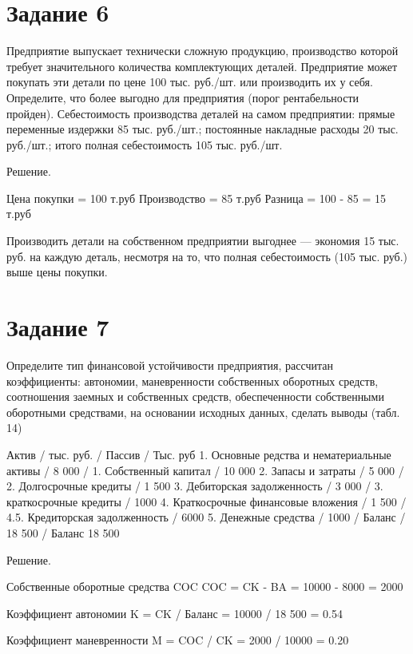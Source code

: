 \documentclass[14pt,a4paper]{extarticle}
\begin{document}
\section{Задание 6}
\begin{sloppypar}
    Предприятие выпускает технически сложную продукцию, производство которой
    требует значительного количества комплектующих деталей. Предприятие может
    покупать эти детали по цене 100 тыс. руб./шт. или производить их у себя.
    Определите, что более выгодно для предприятия (порог рентабельности
    пройден). Себестоимость производства деталей на самом предприятии: прямые
    переменные издержки 85 тыс. руб./шт.; постоянные накладные расходы 20 тыс.
    руб./шт.; итого полная себестоимость 105 тыс. руб./шт.
\end{sloppypar}

Решение.

Цена покупки = 100 т.руб
Производство = 85 т.руб
Разница = 100 - 85 = 15 т.руб

Производить детали на собственном предприятии выгоднее — экономия 15 тыс. руб. на каждую деталь, несмотря на то, что полная себестоимость (105 тыс. руб.) выше цены покупки.


\section{Задание 7}
\begin{sloppypar}
Определите тип финансовой устойчивости предприятия, рассчитан
коэффициенты: автономии, маневренности собственных оборотных средств,
соотношения заемных и собственных средств, обеспеченности собственными
оборотными средствами, на основании исходных данных, сделать выводы (табл. 14)
\end{sloppypar}

Актив / тыс. руб. / Пассив / Тыс. руб
1. Основные редства и нематериальные активы / 8 000 / 1. Собственный капитал / 10 000
2. Запасы и затраты / 5 000 / 2. Долгосрочные кредиты / 1 500
3. Дебиторская задолженность / 3 000 / 3. краткосрочные кредиты / 1000
4. Краткосрочные финансовые вложения / 1 500 / 4.5. Кредиторская задолженность / 6000
5. Денежные средства / 1000 /
Баланс / 18 500 / Баланс 18 500

Решение.

Собственные оборотные средства COC
COC = CK - BA = 10000 - 8000 = 2000

Коэффициент автономии K = CK / Баланс = 10000 / 18 500 = 0.54

Коэффициент маневренности M = COC / CK = 2000 / 10000 = 0.20
\end{document}
